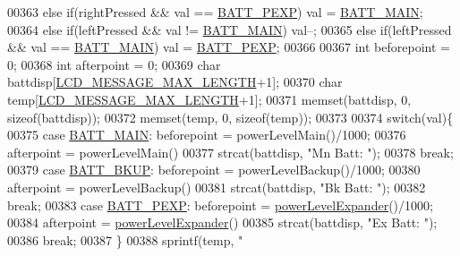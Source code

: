 \begin{DoxyCode}
{00363         \textcolor{keywordflow}{else} \textcolor{keywordflow}{if}(rightPressed && val == \hyperlink{sensors_8h_aaad063d8cfbd393cdc04bcaae68b48ef}{BATT\_PEXP}) val = \hyperlink{sensors_8h_aa48831e4de90908c1b37560e7aba2c5f}{BATT\_MAIN};
00364         \textcolor{keywordflow}{else} \textcolor{keywordflow}{if}(leftPressed && val != \hyperlink{sensors_8h_aa48831e4de90908c1b37560e7aba2c5f}{BATT\_MAIN}) val--;
00365         \textcolor{keywordflow}{else} \textcolor{keywordflow}{if}(leftPressed && val == \hyperlink{sensors_8h_aa48831e4de90908c1b37560e7aba2c5f}{BATT\_MAIN}) val = \hyperlink{sensors_8h_aaad063d8cfbd393cdc04bcaae68b48ef}{BATT\_PEXP};
00366 
00367         \textcolor{keywordtype}{int} beforepoint = 0;
00368         \textcolor{keywordtype}{int} afterpoint = 0;
00369         \textcolor{keywordtype}{char} battdisp[\hyperlink{lcdmsg_8h_abe4c4b70fc6f44ae3680e5b2c68cdd00}{LCD\_MESSAGE\_MAX\_LENGTH}+1];
00370         \textcolor{keywordtype}{char} temp[\hyperlink{lcdmsg_8h_abe4c4b70fc6f44ae3680e5b2c68cdd00}{LCD\_MESSAGE\_MAX\_LENGTH}+1];
00371         memset(battdisp, 0, \textcolor{keyword}{sizeof}(battdisp));
00372         memset(temp, 0, \textcolor{keyword}{sizeof}(temp));
00373 
00374         \textcolor{keywordflow}{switch}(val)\{
00375             \textcolor{keywordflow}{case} \hyperlink{sensors_8h_aa48831e4de90908c1b37560e7aba2c5f}{BATT\_MAIN}: beforepoint = powerLevelMain()/1000;
00376                             afterpoint = powerLevelMain()%
00377                             strcat(battdisp, \textcolor{stringliteral}{"Mn Batt: "});
00378                             \textcolor{keywordflow}{break};
00379             \textcolor{keywordflow}{case} \hyperlink{sensors_8h_a5af8f9e877197004f0f5bf982a755146}{BATT\_BKUP}: beforepoint = powerLevelBackup()/1000;
00380                             afterpoint = powerLevelBackup()%
00381                             strcat(battdisp, \textcolor{stringliteral}{"Bk Batt: "});
00382                             \textcolor{keywordflow}{break};
00383             \textcolor{keywordflow}{case} \hyperlink{sensors_8h_aaad063d8cfbd393cdc04bcaae68b48ef}{BATT\_PEXP}: beforepoint = \hyperlink{sensors_8h_af8de9fe9eba1282f34dce42deebffc93}{powerLevelExpander}()/1000;
00384                             afterpoint = \hyperlink{sensors_8h_af8de9fe9eba1282f34dce42deebffc93}{powerLevelExpander}()%
00385                             strcat(battdisp, \textcolor{stringliteral}{"Ex Batt: "});
00386                             \textcolor{keywordflow}{break};
00387         \}
00388         sprintf(temp, \textcolor{stringliteral}{"%
}}
\end{DoxyCode}
